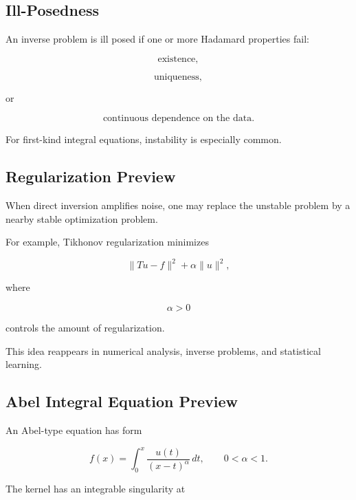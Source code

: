 \subsection{Ill-Posedness}
\label{subsec:integral-equation-ill-posedness}

An inverse problem is ill posed if one or more Hadamard properties fail:

\[
\boxed{
\text{existence},
}
\]

\[
\boxed{
\text{uniqueness},
}
\]

or

\[
\boxed{
\text{continuous dependence on the data}.
}
\]

For first-kind integral equations, instability is especially common.

\subsection{Regularization Preview}
\label{subsec:integral-equation-regularization-preview}

When direct inversion amplifies noise, one may replace the unstable
problem by a nearby stable optimization problem.

For example, Tikhonov regularization minimizes

\[
\boxed{
\|Tu-f\|^2
+
\alpha
\|u\|^2,
}
\]

where

\[
\alpha>0
\]

controls the amount of regularization.

This idea reappears in numerical analysis, inverse problems, and
statistical learning.

\subsection{Abel Integral Equation Preview}
\label{subsec:abel-integral-equation-preview}

An Abel-type equation has form

\[
\boxed{
f(x)
=
\int_0^x
\frac{
u(t)
}{
(x-t)^\alpha
}
\,dt,
\qquad
0<\alpha<1.
}
\]

The kernel has an integrable singularity at


